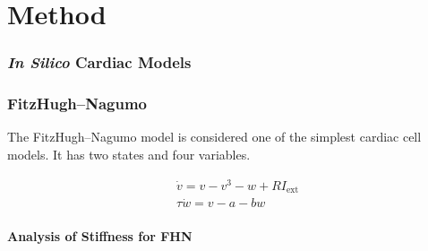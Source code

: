 \chapter{Method}
\label{sec:method}


\subsection{\textit{In Silico} Cardiac Models}




\subsection{FitzHugh–Nagumo}

The FitzHugh–Nagumo model is considered one of the simplest cardiac cell models. It has two states and four variables.

\begin{align}\label{eq:fhn} %
	&\dot{v}=v-v^{3}-w+R I_{\mathrm{ext}} \\
	&\tau \dot{w}=v-a-b w
\end{align}



\subsubsection{Analysis of Stiffness for FHN}

